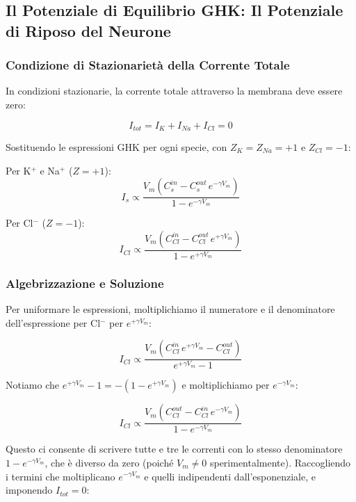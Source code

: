 \subsection{Il Potenziale di Equilibrio GHK: Il Potenziale di Riposo del Neurone}

\subsubsection{Condizione di Stazionarietà della Corrente Totale}

In condizioni stazionarie, la corrente totale attraverso la membrana deve essere zero:

\begin{equation}
I_{tot} = I_K + I_{Na} + I_{Cl} = 0
\end{equation}

Sostituendo le espressioni GHK per ogni specie, con $Z_K = Z_{Na} = +1$ e $Z_{Cl} = -1$:

Per K$^+$ e Na$^+$ ($Z = +1$):
\begin{equation}
I_s \propto \frac{ V_m (C_s^{in} - C_s^{out}\,e^{-\gamma V_m})}{1 - e^{-\gamma V_m}}
\end{equation}

Per Cl$^-$ ($Z = -1$):
\begin{equation}
I_{Cl} \propto \frac{ V_m (C_{Cl}^{in} - C_{Cl}^{out}\,e^{+\gamma V_m})}{1 - e^{+\gamma V_m}}
\end{equation}

\subsubsection{Algebrizzazione e Soluzione}

Per uniformare le espressioni, moltiplichiamo il numeratore e il denominatore dell'espressione per Cl$^-$ per $e^{+\gamma V_m}$:

\begin{equation}
I_{Cl} \propto \frac{ V_m (C_{Cl}^{in}\,e^{+\gamma V_m} - C_{Cl}^{out})}{e^{+\gamma V_m} - 1}
\end{equation}

Notiamo che $e^{+\gamma V_m} - 1 = -(1 - e^{+\gamma V_m})$ e moltiplichiamo per $e^{-\gamma V_m}$:

\begin{equation}
I_{Cl} \propto \frac{ V_m (C_{Cl}^{out} - C_{Cl}^{in}\,e^{-\gamma V_m})}{1 - e^{-\gamma V_m}}
\end{equation}

Questo ci consente di scrivere tutte e tre le correnti con lo stesso denominatore $1 - e^{-\gamma V_m}$, che è diverso da zero (poiché $V_m \neq 0$ sperimentalmente). Raccogliendo i termini che moltiplicano $e^{-\gamma V_m}$ e quelli indipendenti dall'esponenziale, e imponendo $I_{tot} = 0$:

